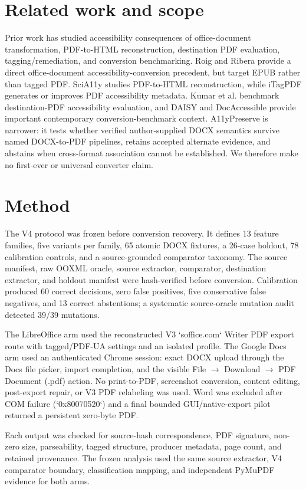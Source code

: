 \documentclass[10pt]{article}
\begin{document}
\section{Related work and scope}
Prior work has studied accessibility consequences of office-document transformation, PDF-to-HTML reconstruction, destination PDF evaluation, tagging/remediation, and conversion benchmarking. Roig and Ribera provide a direct office-document accessibility-conversion precedent, but target EPUB rather than tagged PDF. SciA11y studies PDF-to-HTML reconstruction, while iTagPDF generates or improves PDF accessibility metadata. Kumar et al. benchmark destination-PDF accessibility evaluation, and DAISY and DocAccessible provide important contemporary conversion-benchmark context. A11yPreserve is narrower: it tests whether verified author-supplied DOCX semantics survive named DOCX-to-PDF pipelines, retains accepted alternate evidence, and abstains when cross-format association cannot be established. We therefore make no first-ever or universal converter claim.

\section{Method}
The V4 protocol was frozen before conversion recovery. It defines 13 feature families, five variants per family, 65 atomic DOCX fixtures, a 26-case holdout, 78 calibration controls, and a source-grounded comparator taxonomy. The source manifest, raw OOXML oracle, source extractor, comparator, destination extractor, and holdout manifest were hash-verified before conversion. Calibration produced 60 correct decisions, zero false positives, five conservative false negatives, and 13 correct abstentions; a systematic source-oracle mutation audit detected 39/39 mutations.

The LibreOffice arm used the reconstructed V3 `soffice.com` Writer PDF export route with tagged/PDF-UA settings and an isolated profile. The Google Docs arm used an authenticated Chrome session: exact DOCX upload through the Docs file picker, import completion, and the visible File $\rightarrow$ Download $\rightarrow$ PDF Document (.pdf) action. No print-to-PDF, screenshot conversion, content editing, post-export repair, or V3 PDF relabeling was used. Word was excluded after COM failure (`0x80070520`) and a final bounded GUI/native-export pilot returned a persistent zero-byte PDF.

Each output was checked for source-hash correspondence, PDF signature, non-zero size, parseability, tagged structure, producer metadata, page count, and retained provenance. The frozen analysis used the same source extractor, V4 comparator boundary, classification mapping, and independent PyMuPDF evidence for both arms.
\end{document}
